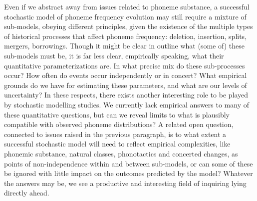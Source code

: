 Even if we abstract away from issues related to phoneme substance, a successful stochastic model of phoneme frequency evolution may still require a mixture of sub-models, obeying different principles, given the existence of the multiple types of historical processes that affect phoneme frequency: deletion, insertion, splits, mergers, borrowings. Though it might be clear in outline what (some of) these sub-models must be, it is far less clear, empirically speaking, what their quantitative parameterizations are. In what precise mix do these sub-processes occur? How often do events occur independently or in concert? What empirical grounds do we have for estimating these parameters, and what are our levels of uncertainty? In these respects, there exists another interesting role to be played by stochastic modelling studies. We currently lack empirical answers to many of these quantitative questions, but can we reveal limits to what is plausibly compatible with observed phoneme distributions? A related open question, connected to issues raised in the previous paragraph, is to what extent a successful stochastic model will need to reflect empirical complexities, like phonemic substance, natural classes, phonotactics and concerted changes, as points of non-independence within and between sub-models, or can some of these be ignored with little impact on the outcomes predicted by the model? Whatever the answers may be, we see a productive and interesting field of inquiring lying directly ahead.

